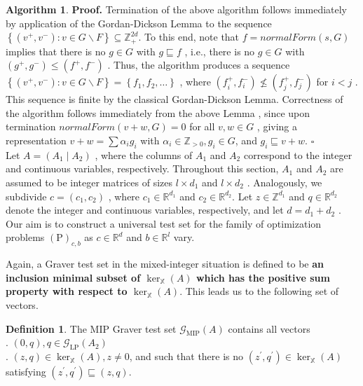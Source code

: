 \documentclass{article}
\theoremstyle{plain}
\theoremstyle{definition}
\newtheorem{definition}[theorem]{Definition}
\newtheorem{algorithm}[theorem]{Algorithm}
\begin{document}
\begin{algorithm}
\noindent\textbf{Proof. } Termination of the above algorithm follows immediately by application of the Gordan-Dickson Lemma to the sequence  $\left\{\left(v^{+}, v^{-}\right): v \in G \backslash F\right\} \subseteq \mathbb{Z}_{+}^{2 d}$. To this end, note that  $f=  normalForm  (s, G)$  implies that there is no  $g \in G$  with  $g \sqsubseteq f$ , i.e., there is no  $g \in G$  with  $\left(g^{+}, g^{-}\right) \leq\left(f^{+}, f^{-}\right)$ . Thus, the algorithm produces a sequence  $\left\{\left(v^{+}, v^{-}\right): v \in G \backslash F\right\}=\left\{f_{1}, f_{2}, \ldots\right\}$ , where  $\left(f_{i}^{+}, f_{i}^{-}\right) \not \leq\left(f_{j}^{+}, f_{j}^{-}\right) $ for  $i<j$ . This sequence is finite by the classical Gordan-Dickson Lemma. Correctness of the algorithm follows immediately from the above Lemma , since upon termination $normalForm (v+w, G)=0 $ for all  $v, w \in G$ , giving a representation  $v+w=\sum \alpha_{i} g_{i}$  with  $\alpha_{i} \in \mathbb{Z}_{>0}, g_{i} \in G $, and  $g_{i} \sqsubseteq v+w.$  \hfill $\square$\\

Let  $A=\left(A_{1} \mid A_{2}\right)$ , where the columns of  $A_{1}$  and  $A_{2}$  correspond to the integer and continuous variables, respectively. Throughout this section,  $A_{1}$  and  $A_{2}$  are assumed to be integer matrices of sizes  $l \times d_{1}$  and $ l \times d_{2}$ . Analogously, we subdivide  $c=\left(c_{1}, c_{2}\right)$ , where $ c_{1} \in \mathbb{R}^{d_{1}}$  and  $c_{2} \in \mathbb{R}^{d_{2}}$. Let  $z \in \mathbb{Z}^{d_{1}}$  and  $q \in \mathbb{R}^{d_{2}}$  denote the integer and continuous variables, respectively, and let  $d=d_{1}+d_{2}$ . Our aim is to construct a universal test set for the family of optimization problems $ (\mathrm{P})_{c, b}$  as $c \in \mathbb{R}^{d}$  and  $b \in \mathbb{R}^{l}$  vary.

Again, a Graver test set in the mixed-integer situation is defined to be \textbf{an inclusion minimal subset of  $\operatorname{ker}_{\mathbb{X}}(A)$  which has the positive sum property with respect to $ \operatorname{ker}_{\mathbb{X}}(A)$}. This leads us to the following set of vectors.

\begin{definition}The MIP Graver test set  $\mathcal{G}_{\mathrm{MIP}}(A)$  contains all vectors \\
 . $(0, q), q \in \mathcal{G}_{\mathrm{LP}}\left(A_{2}\right)$  \\
 . $(z, q) \in \operatorname{ker}_{\mathbb{X}}(A), z \neq 0 $, and such that there is no  $\left(z^{\prime}, q^{\prime}\right) \in \operatorname{ker}_{\mathbb{X}}(A)$  satisfying  $\left(z^{\prime}, q^{\prime}\right) \sqsubseteq(z, q) $.\end{definition}


\end{algorithm}
\end{document}
